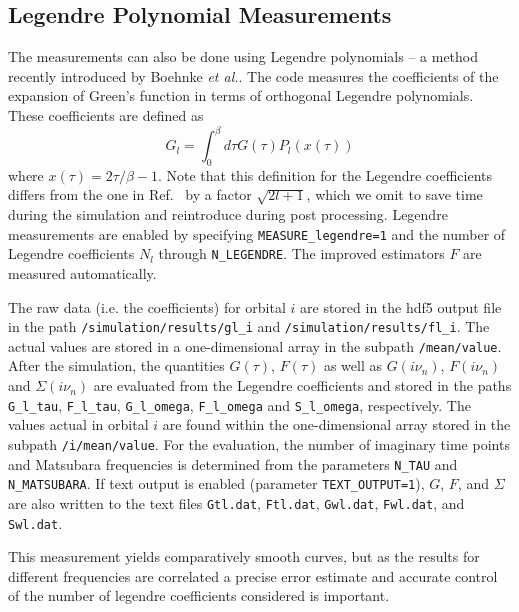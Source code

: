 \documentclass[aps,prb,floatfix,superscriptaddress,twocolumn,notitlepage]{revtex4-1}
\newcommand{\iom}{{\ensuremath{i\nu}}}
\begin{document}
\subsection{Legendre Polynomial Measurements}
The measurements can also be done using Legendre polynomials -- a method recently introduced by Boehnke {\it et al.}\cite{Boehnke11}.
The code measures the coefficients of the expansion of Green's function in terms of orthogonal Legendre polynomials. These coefficients are defined as
\begin{equation}
G_{l} = \int_{0}^{\beta}d\tau G(\tau) P_{l}(x(\tau)) 
\end{equation}
where $x(\tau)=2\tau/\beta -1$. Note that this definition for the Legendre coefficients differs from the one in Ref.~ by a factor $\sqrt{2l+1}$, which we omit to save time during the simulation and reintroduce during post processing.
Legendre measurements are enabled by specifying \verb#MEASURE_legendre=1# and the number of Legendre coefficients $N_{l}$ through \verb#N_LEGENDRE#. 
The improved estimators $F$ \cite{Hafermann12} are measured automatically.

The raw data (i.e. the coefficients) for orbital $i$ are stored in the hdf5 output file in the path \verb#/simulation/results/gl_i# and \verb#/simulation/results/fl_i#. The actual values are stored in a one-dimensional array in the subpath \verb#/mean/value#. After the simulation, the quantities $G(\tau)$, $F(\tau)$ as well as $G(\iom_{n})$, $F(\iom_{n})$ and $\Sigma(\iom_{n})$ are evaluated from the Legendre coefficients and stored in the paths \verb#G_l_tau#, \verb#F_l_tau#, \verb#G_l_omega#, \verb#F_l_omega# and \verb#S_l_omega#, respectively. The values actual in orbital $i$ are found within the one-dimensional array stored in the subpath \verb#/i/mean/value#. For the evaluation, the number of imaginary time points and Matsubara frequencies is determined from the parameters \verb#N_TAU# and \verb#N_MATSUBARA#.
If text output is enabled (parameter \verb#TEXT_OUTPUT=1#), $G$, $F$, and $\Sigma$ are also written to the text files \verb#Gtl.dat#, \verb#Ftl.dat#, \verb#Gwl.dat#, \verb#Fwl.dat#, and \verb#Swl.dat#.

This measurement yields comparatively smooth curves, but as the results for different frequencies are correlated a precise error estimate and accurate control of the number of legendre coefficients considered is important.
\end{document}
